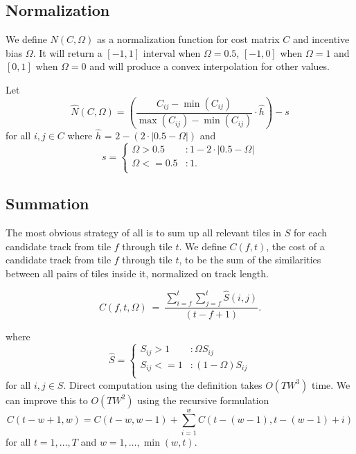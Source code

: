 \documentclass[twocolumn]{article}
\begin{document}
	\subsection{Normalization}
	
	We define $N(C,\Omega)$ as a normalization function for cost matrix $C$ and incentive bias $\Omega$. It will return a $[-1,1]$ interval when $\Omega=0.5$, $[-1,0]$ when $\Omega=1$  and $[0, 1]$ when $\Omega=0$ and will produce a convex interpolation for other values.
	
	Let 
	\begin{dmath*}
		\hat N(C,\Omega) = \left( \frac{ C_{ij} - \min \left( C_{ij} \right) }{ \max \left( C_{ij} \right) - \min \left( C_{ij} \right) } \cdot \hat h  \right)-s
	\end{dmath*}
	for all $i,j \in C$ where $\hat h$ = $2-\left( 2\cdot|0.5-\Omega| \right)$ and 
	\begin{dmath*}
		s= { \left\{
			\begin{array}{ll}
				\Omega > 0.5  & :   1-2 \cdot |0.5-\Omega|  \\
				\Omega <= 0.5 & : 1.  \\
			\end{array}
			\right.}
	\end{dmath*}
	
	\subsection{Summation}
	
	The most obvious strategy of all is to sum up all relevant tiles in $S$ for each candidate track from tile $f$ through tile $t$. We define $C(f,t)$, the cost of a candidate track from tile $f$ through tile $t$, to be the sum of the similarities between all pairs of tiles inside it, normalized on track length.
	
	\begin{dmath*}
		C(f,t, \Omega) ~=~ \frac{ \sum_{i=f}^{t} \sum_{j=f}^{t} \hat S(i,j) }{ (t-f+1) }.
	\end{dmath*}
	
	where
	\begin{dmath*}
		\hat S=	{ \left\{
			\begin{array}{ll}
				S_{ij} > 1  & :  \Omega S_{ij}   \\
				S_{ij} <= 1 & :  \left( 1-\Omega \right) S_{ij} \\
			\end{array}
			\right.} 
	\end{dmath*} for all $i,j \in S.$ Direct computation using the definition takes $O(TW^3)$ time. We can improve this to $O(TW^2)$ using the recursive formulation
	\begin{dmath*}
		C( t-w+1,w ) = C( t-w,w-1 ) + \sum_{i=1}^{w} C(t-(w-1),t-(w-1)+i)
	\end{dmath*} for all $t=1,\ldots, T$ and $w=1,\ldots,\min(w,t)$.
	
\end{document}
